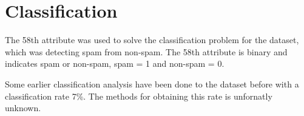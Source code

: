 \section{Classification}
The 58th attribute was used to solve the classification problem for the dataset, which was detecting spam from non-spam. The 58th attribute is binary and indicates spam or non-spam, spam = 1 and non-spam = 0.

Some earlier classification analysis have been done to the dataset before with a classification rate 7\%. The methods for obtaining this rate is unfornatly unknown.  


